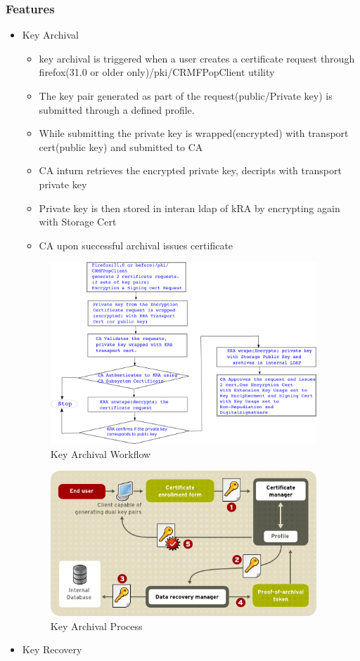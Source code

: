 \documentclass[a4paper]{article}
\begin{document}
\subsubsection{Features}
\begin{itemize}
    \item Key Archival
        \begin{itemize}
            \item key archival is triggered when a user creates a certificate request through
                firefox(31.0 or older only)/pki/CRMFPopClient utility
            \item The key pair generated as part of the request(public/Private key) is submitted
                through a defined profile. 
            \item While submitting the private key is wrapped(encrypted) with transport cert(public key)
                and submitted to CA
            \item CA inturn retrieves the encrypted private key, decripts with transport private key 
            \item Private key is then stored in interan ldap of kRA by encrypting again with Storage Cert
            \item CA upon successful archival issues certificate
        \end{itemize}
        \begin{figure}[H]
            \centering
            \includegraphics[width=100mm]{key-archival1.png}
            \caption{Key Archival Workflow}
        \end{figure}
        \begin{figure}[H]
            \centering
            \includegraphics[width=100mm]{key-archival-process.png}
            \caption{Key Archival Process}
        \end{figure}
    \item Key Recovery
\end{itemize}
\end{document}
